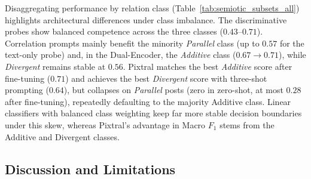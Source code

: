 Disaggregating performance by relation class (Table~\ref{tab:semiotic_subsets_all}) highlights architectural differences under class imbalance. The discriminative probes show balanced competence across the three classes ($0.43$--$0.71$). Correlation prompts mainly benefit the minority \textit{Parallel} class (up to $0.57$ for the text-only probe) and, in the Dual-Encoder, the \textit{Additive} class ($0.67 \rightarrow 0.71$), while \textit{Divergent} remains stable at $0.56$. Pixtral matches the best \textit{Additive} score after fine-tuning ($0.71$) and achieves the best \textit{Divergent} score with three-shot prompting ($0.64$), but collapses on \textit{Parallel} posts (zero in zero-shot, at most $0.28$ after fine-tuning), repeatedly defaulting to the majority Additive class. Linear classifiers with balanced class weighting keep far more stable decision boundaries under this skew, whereas Pixtral's advantage in Macro $F_1$ stems from the Additive and Divergent classes.

\subsection{Discussion and Limitations}
\label{sec:limitations}


